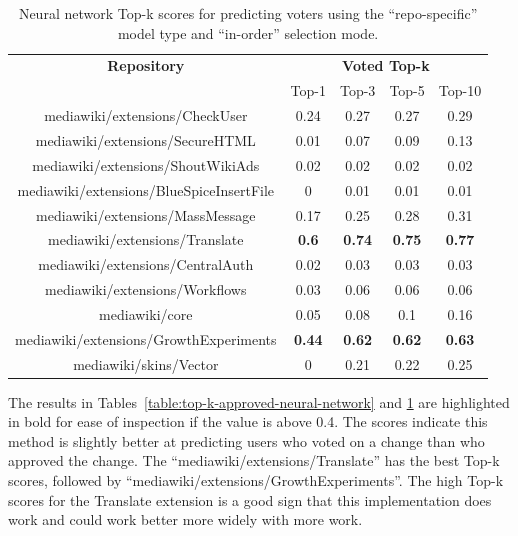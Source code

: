\begin{table}[H]
\begin{center}
\begin{tabular}{@{}c c c c c@{}} 
\hline
    \textbf{Repository} &
    \multicolumn{4}{c}{\textbf{Voted Top-k}} \\
      & {Top-1} & {Top-3} & {Top-5} & {Top-10} \\
      \hline
mediawiki/extensions/CheckUser & 0.24 & 0.27 & 0.27 & 0.29 \\
mediawiki/extensions/SecureHTML & 0.01 & 0.07 & 0.09 & 0.13 \\
mediawiki/extensions/ShoutWikiAds & 0.02 & 0.02 & 0.02 & 0.02 \\
mediawiki/extensions/BlueSpiceInsertFile & 0 & 0.01 & 0.01 & 0.01 \\
mediawiki/extensions/MassMessage & 0.17 & 0.25 & 0.28 & 0.31 \\
mediawiki/extensions/Translate & \textbf{0.6} & \textbf{0.74} & \textbf{0.75} & \textbf{0.77} \\
mediawiki/extensions/CentralAuth & 0.02 & 0.03 & 0.03 & 0.03 \\
mediawiki/extensions/Workflows & 0.03 & 0.06 & 0.06 & 0.06 \\
mediawiki/core & 0.05 & 0.08 & 0.1 & 0.16 \\
mediawiki/extensions/GrowthExperiments & \textbf{0.44} & \textbf{0.62} & \textbf{0.62} & \textbf{0.63} \\
mediawiki/skins/Vector & 0 & 0.21 & 0.22 & 0.25 \\
\hline
\end{tabular}
\end{center}
\caption{\label{table:top-k-voted-neural-network}Neural network Top-k scores for predicting voters using the ``repo-specific'' model type and ``in-order'' selection mode.}
\end{table}

The results in Tables~\ref{table:top-k-approved-neural-network} and \ref{table:top-k-voted-neural-network} are highlighted in bold for ease of inspection if the value is above 0.4. The scores indicate this method is slightly better at predicting users who voted on a change than who approved the change. The ``mediawiki/extensions/Translate'' has the best Top-k scores, followed by ``mediawiki/extensions/GrowthExperiments''. The high Top-k scores for the Translate extension is a good sign that this implementation does work and could work better more widely with more work.

